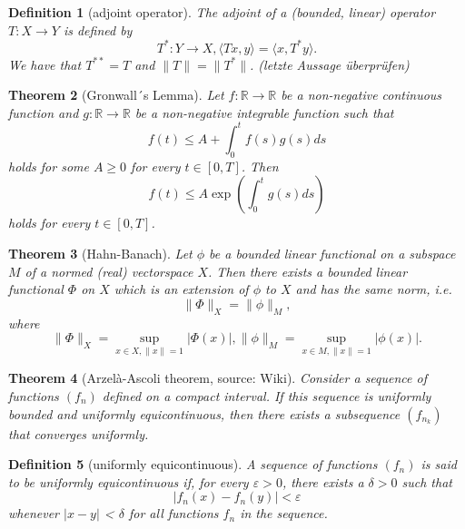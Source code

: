 \documentclass[12pt,a4paper]{article}
\newtheorem{definition}{Definition}
\newtheorem{thm}[definition]{Theorem}
\begin{document}
\begin{definition}[adjoint operator]
The adjoint of a (bounded, linear) operator $T:X\rightarrow Y$ is defined by
\begin{equation}
T^*:Y\rightarrow X, \langle Tx, y \rangle = \langle x, T^*y \rangle.
\end{equation}
We have that $T^{**}=T$ and $\lVert T \rVert = \lVert T^* \rVert$. (letzte Aussage überprüfen)
\end{definition}

\begin{thm}[Gronwall´s Lemma]
Let $f:\mathbb{R}\rightarrow\mathbb{R}$ be a non-negative continuous function and $g:\mathbb{R}\rightarrow\mathbb{R}$ be a  non-negative integrable function such that
\begin{equation}
f(t)\leq A+\int_0^tf(s)g(s)ds
\end{equation}
holds for some $A\geq 0$ for every $t\in[0,T]$. Then
\begin{equation}
f(t)\leq A\exp(\int_0^t g(s) ds)
\end{equation}
holds for every $t\in[0,T]$.
\end{thm}

\begin{thm}[Hahn-Banach]
Let $\phi$ be a bounded linear functional on a subspace $M$ of a normed (real) vectorspace $X$. Then there exists a bounded linear functional $\Phi$ on $X$ which is an extension of $\phi$ to $X$ and has the same norm, i.e.
\begin{equation}
\lVert\Phi\rVert_X=\lVert \phi \rVert_M,
\end{equation}
where
\begin{equation}
\lVert\Phi\rVert_X=\sup_{x\in X,\lVert x\rVert=1} \vert\Phi(x)\vert, 
\lVert \phi \rVert_M = \sup_{x\in M,\lVert x\rVert=1} \vert\phi(x)\vert.
\end{equation}
\end{thm}

\begin{thm}[Arzelà-Ascoli theorem, source: Wiki]
Consider a sequence of functions $(f_n)$ defined on a compact interval. If this sequence is uniformly bounded and uniformly equicontinuous, then there exists a subsequence $(f_{n_k})$ that converges uniformly.
\end{thm}

\begin{definition}[uniformly equicontinuous]
A sequence of functions $(f_n)$ is said to be uniformly equicontinuous if, for every $\varepsilon > 0$, there exists a $\delta > 0$ such that
\begin{equation}
\left|f_{n}(x)-f_{n}(y)\right|<\varepsilon
\end{equation}
whenever $| x-y |$ < $\delta$ for all functions $f_n$ in the sequence.
\end{definition}
\end{document}
